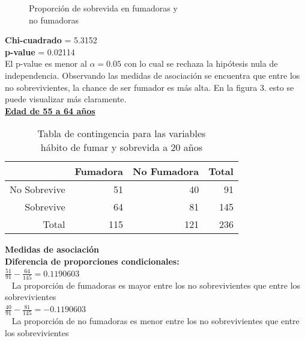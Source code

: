 \documentclass[12pt,letterpaper,fleqn]{article}
\begin{document}
\begin{enumerate}[label=\textbf{\arabic*.}]
\begin{enumerate}[label=\textbf{\alph*.}]
                \begin{figure}[!htb]
                    \centering
                    
                    \caption{Proporción de sobrevida en fumadoras y \\no fumadoras}
                    \label{fig:figure3}
                \end{figure}
                \FloatBarrier
                \textbf{Chi-cuadrado} = 5.3152 \\
                \textbf{p-value} = 0.02114 \\
                El p-value es menor al $ \alpha = 0.05 $ con lo cual se rechaza la hipótesis nula de independencia. Observando las medidas de asociación se encuentra que entre los no sobrevivientes, la chance de ser fumador es más alta. En la figura 3. esto se puede visualizar más claramente.\\

                \underline{\textbf{Edad de 55 a 64 años}}
                \begin{table}[ht]
                    \centering
                    \caption{Tabla de contingencia para las variables \\ hábito de fumar y sobrevida a 20 años}
                    \begin{tabular}{rrrr}
                      \hline
                     & Fumadora & No Fumadora \vline& Total \\
                      \hline
                    No Sobrevive & 51 & 40 \vline& 91 \\
                      Sobrevive & 64 & 81 \vline& 145 \\
                      \hline
                      Total & 115 & 121 \vline& 236 \\
                       \hline
                    \end{tabular}
                \end{table}

                \textbf{Medidas de asociación} \\
                \textbf{Diferencia de proporciones condicionales:} \\
                $ \frac{51}{91}-\frac{64}{145} = 0.1190603 $ \\ 
                La proporción de fumadoras es mayor entre los no sobrevivientes que entre los sobrevivientes \\
                $ \frac{40}{91}-\frac{81}{145} = -0.1190603 $ \\ 
                La proporción de no fumadoras es menor entre los no sobrevivientes que entre los sobrevivientes\\


\end{enumerate}
\end{enumerate}
\end{document}
